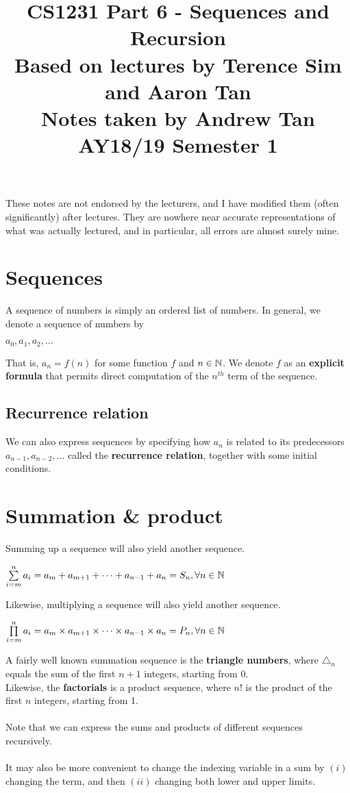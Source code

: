 \documentclass[a4paper]{article}
\title{%
	CS1231 Part 6 - Sequences and Recursion  \\
	\large Based on lectures by Terence Sim and Aaron Tan
	\\ Notes taken by Andrew Tan
	\\ AY18/19 Semester 1
	\\ }
\author{}
\date{\vspace{-5ex}}
\begin{document}
\maketitle

\begin{center}\begin{minipage}[c]{0.9\textwidth}\centering\footnotesize These notes are not endorsed by the lecturers, and I have modified them (often significantly) after lectures. They are nowhere near accurate representations of what was actually lectured, and in particular, all errors are almost surely mine.\end{minipage}\end{center}

\section{Sequences}
A sequence of numbers is simply an ordered list of numbers. In general, we denote a sequence of numbers by
\begin{center}
	$a_0,a_1,a_2,\dots$
\end{center}
That is, $a_n = f(n)$ for some function $f$ and $n\in \mathbb{N}$. We denote $f$ as an \textbf{explicit formula} that permits direct computation of the $n^{th}$ term of the sequence.

\subsection{Recurrence relation}
We can also express sequences by specifying how $a_n$ is related to its predecessors $a_{n-1}, a_{n-2},\dots$ called the \textbf{recurrence relation}, together with some initial conditions.

\section{Summation \& product}
Summing up a sequence will also yield another sequence.
\begin{center}
	$\sum\limits_{i=m}^{n} a_i = a_m + a_{m+1} + \dots + a_{n-1} + a_n = S_n, \forall n \in \mathbb{N}$
\end{center}
Likewise, multiplying a sequence will also yield another sequence.
\begin{center}
	$\prod\limits_{i=m}^{n} a_i = a_m \times a_{m+1} \times \dots \times a_{n-1} \times a_n = P_n, \forall n \in \mathbb{N}$
\end{center}
A fairly well known summation sequence is the \textbf{triangle numbers}, where $\triangle_n$ equals the sum of the first $n+1$ integers, starting from 0.\\
Likewise, the \textbf{factorials} is a product sequence, where $n!$ is the product of the first $n$ integers, starting from 1.\\\\
Note that we can express the sums and products of different sequences recursively.\\\\
It may also be more convenient to change the indexing variable in a sum by $(i)$ changing the term, and then $(ii)$ changing both lower and upper limits.
\end{document}
